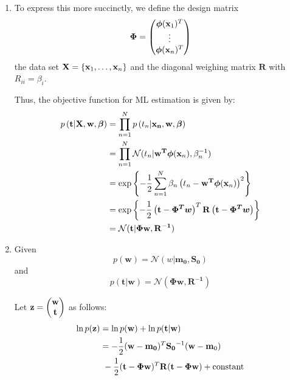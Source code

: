 \documentclass[reqno]{amsart}
\begin{document}
\begin{enumerate}[label=\textbf{(\Roman*)}]
        \solution
        \begin{enumerate}[label=\textbf{(\alph*)}]
            \item To express this more succinctly, we define the design matrix \[\boldsymbol{\Phi} = \begin{pmatrix}\boldsymbol{\phi}(\mathbf{x}_1)^T \\ \vdots \\ \boldsymbol{\phi}(\mathbf{x}_n)^T\end{pmatrix} \]
            the data set \(\mathbf{X} = \left\{\mathbf{x}_1, \ldots, \mathbf{x}_{n}\right\}\)
            and the diagonal weighing matrix \(\mathbf{R}\) with \(R_{ii} = \beta_i\).
            
            Thus, the objective function for ML estimation is given by:
            \begin{align}
                \begin{split}
                    p\left({\mathbf{t}} \middle| {\mathbf{X}, \mathbf{w}, \boldsymbol{\beta}}\right)  
                    &= \prod_{n = 1}^{N} p\left(t_n | \mathbf{x_n}, \mathbf{w}, \boldsymbol{\beta}\right) \\
                    &= \prod_{n = 1}^{N} \mathcal{N} (t_n | \mathbf{w^T} \boldsymbol{\phi}(\mathbf{x}_n), \beta_n^{-1}) \\
                    &= \exp \left\{- \frac{1}{2} \sum_{n = 1}^{N} \beta_n \left(t_n - \mathbf{w^T} \boldsymbol{\phi}(\mathbf{x}_n)\right)^2\right\} \\
                    &= \exp \left\{- \frac{1}{2} \left(\mathbf{t} - \boldsymbol{\Phi^T w}\right)^T \mathbf{R} \left(\mathbf{t} - \boldsymbol{\Phi^T w}\right)\right\} \\
                    &= \mathcal{N} (\mathbf{t}|\mathbf{\Phi w, R^{-1}}) \label{eq:ml} 
                \end{split}
            \end{align}
            \item 
                Given
                    \[p(\mathbf{w}) = \mathcal{N}(w|\mathbf{m_0, S_0})\]
                and
                    \[p(\mathbf{t|w}) = \mathcal{N}(\mathbf{\Phi w, R^{-1}})\]

                Let \(\mathbf{z} = \begin{pmatrix}\mathbf{w} \\ \mathbf{t}\end{pmatrix}\) as follows:
                \begin{align}
                    \begin{split}
                        \ln p(\mathbf{z}) &= \ln p(\mathbf{w}) + \ln p(\mathbf{t|w}) \\
                            &= -\frac{1}{2} (\mathbf{w - m_0})^T \mathbf{S_0}^{-1} (\mathbf{w - m}_0) \\
                            &\ - \frac{1}{2} (\mathbf{t - \Phi w})^T \mathbf{R} (\mathbf{t - \Phi w}) + \text{constant} \label{eq:map1}
                    \end{split}
                \end{align}


\end{enumerate}
\end{enumerate}
\end{document}
